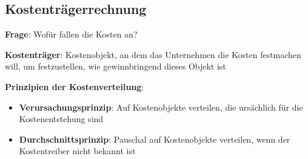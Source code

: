 \subsection{Kostenträgerrechnung}
\textbf{Frage}: Wofür fallen die  Kosten an?

\textbf{Kostenträger}: Kostenobjekt, an dem das Unternehmen die Kosten festmachen will, um festzustellen, wie gewinnbringend dieses Objekt ist

\textbf{Prinzipien der Kostenverteilung}:
\begin{itemize}
	\item \textbf{Verursachungsprinzip}: Auf Kostenobjekte verteilen, die ursächlich für die
	Kostenentstehung sind
	\item \textbf{Durchschnittsprinzip}: Pauschal auf Kostenobjekte verteilen, wenn der
	Kostentreiber nicht bekannt ist
\end{itemize}

